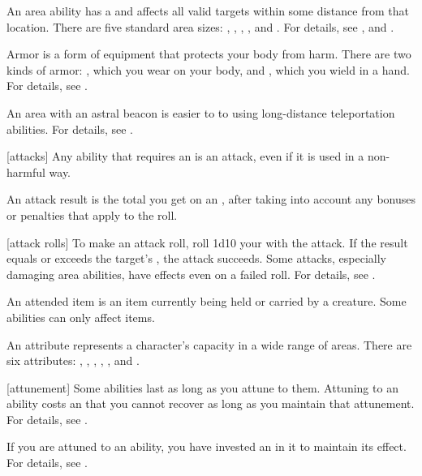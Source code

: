  An area ability has a  and affects all valid targets within some distance from that location.
There are five standard area sizes: \smallarea, \medarea, \largearea, \hugearea, and \gargarea.
For details, see , and .

 Armor is a form of equipment that protects your body from harm.
There are two kinds of armor: , which you wear on your body, and , which you wield in a hand.
For details, see .

 An area with an astral beacon is easier to  to using long-distance teleportation abilities.
For details, see .

[attacks] Any ability that requires an  is an attack, even if it is used in a non-harmful way.

 An attack result is the total you get on an , after taking into account any bonuses or penalties that apply to the roll.

[attack rolls] To make an attack roll, roll 1d10 \add your  with the attack.
If the result equals or exceeds the target's , the attack succeeds.
Some attacks, especially damaging area abilities, have effects even on a failed roll.
For details, see .

 An attended item is an item currently being held or carried by a creature.
Some abilities can only affect  items.

 An attribute represents a character's capacity in a wide range of areas.
There are six attributes: , , , , , and .

[attunement] Some abilities last as long as you attune to them.
Attuning to an ability costs an  that you cannot recover as long as you maintain that attunement.
For details, see .

 If you are attuned to an ability, you have invested an  in it to maintain its effect.
For details, see .

